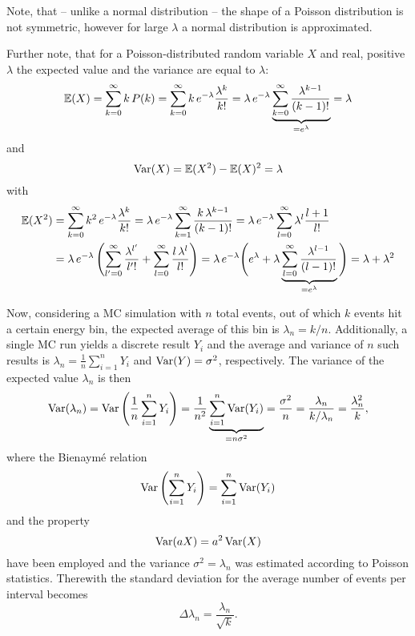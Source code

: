 Note, that -- unlike a normal distribution -- the shape of a Poisson
distribution is not symmetric, however for large $\lambda$ a normal
distribution is approximated.

Further note, that for a Poisson-distributed random variable $X$ and real,
positive $\lambda$ the expected value and the variance are equal to $\lambda$:
\begin{equation}
    \operatorname{\mathbb{E}}(X)=\sum_{k=0}^{\infty}k\,P(k)
    =\sum_{k=0}^{\infty}k\,e^{-\lambda}\frac{\lambda^k}{k!}
    =\lambda\,e^{-\lambda}
    \underbrace{\sum_{k=0}^{\infty}\frac{\lambda^{k-1}}{(k-1)!}}_{=e^{\lambda}}
    =\lambda
    \label{eq:poisson-exp}
\end{equation}
and
\begin{equation}
    \operatorname{Var}(X)=\operatorname{\mathbb{E}}(X^2)-\operatorname{\mathbb{E}}(X)^2=\lambda
    \label{eq:possion-var}
\end{equation}
with
\begin{align*}
    \Ex(X^2)&=\sum_{k=0}^{\infty}k^2\,e^{-\lambda}\frac{\lambda^k}{k!}
    =\lambda\,e^{-\lambda}\sum_{k=1}^{\infty}\frac{k\,\lambda^{k-1}}{(k-1)!}
    =\lambda\,e^{-\lambda}\sum_{l=0}^{\infty}\lambda^l\frac{l+1}{l!}
    \\
    &=\lambda\,e^{-\lambda}\left(
    \sum_{l'=0}^{\infty}\frac{\lambda^{l'}}{l'!}
    +\sum_{l=0}^{\infty}\frac{l\,\lambda^l}{l!}
    \right)
    =\lambda\,e^{-\lambda}\Bigg(
    e^{\lambda}+\lambda\underbrace{%
        \sum_{l=0}^{\infty}\frac{\lambda^{l-1}}{(l-1)!}}_{=e^\lambda}
    \Bigg)
    =\lambda+\lambda^2
\end{align*}

Now, considering a MC simulation with $n$ total events, out of which $k$ events
hit a certain energy bin, the expected average of this bin is $\lambda_n=k/n$.
Additionally, a single MC run yields a discrete result $Y_i$ and the average
and variance of $n$ such results is $\lambda_n=\frac{1}{n}\sum_{i=1}^{n}Y_i$
and $\operatorname{Var}(Y)=\sigma^2$, respectively.
The variance of the expected value $\lambda_n$ is then
\begin{equation}
    \operatorname{Var}(\lambda_n)=\operatorname{Var}\left(\frac{1}{n}\sum_{i=1}^{n}Y_i\right)
    =\frac{1}{n^2}\underbrace{\sum_{i=1}^{n}\operatorname{Var}(Y_i)}_{=n\sigma^2}
    =\frac{\sigma^2}{n}=\frac{\lambda_n}{k/\lambda_n}=\frac{\lambda_n^2}{k},
\end{equation}
where the Bienaymé relation
\begin{equation*}
    \operatorname{Var}\left(\sum_{i=1}^{n}Y_i\right)=\sum_{i=1}^{n}\operatorname{Var}(Y_i)
\end{equation*}
and the property
\begin{equation*}
    \operatorname{Var}(aX)=a^2\operatorname{Var}(X)
\end{equation*}
have been employed and the variance $\sigma^2=\lambda_n$ was estimated
according to Poisson statistics.
Therewith the standard deviation for the average number of events per interval
becomes
\begin{equation}
    \Delta\lambda_n=\frac{\lambda_n}{\sqrt{k}}.
    \label{eq:mc-std}
\end{equation}

